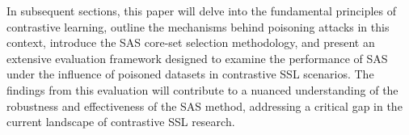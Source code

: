 In subsequent sections, this paper will delve into the fundamental principles of contrastive learning, outline the mechanisms behind poisoning attacks in this context, introduce the SAS core-set selection methodology, and present an extensive evaluation framework designed to examine the performance of SAS under the influence of poisoned datasets in contrastive SSL scenarios. The findings from this evaluation will contribute to a nuanced understanding of the robustness and effectiveness of the SAS method, addressing a critical gap in the current landscape of contrastive SSL research.
